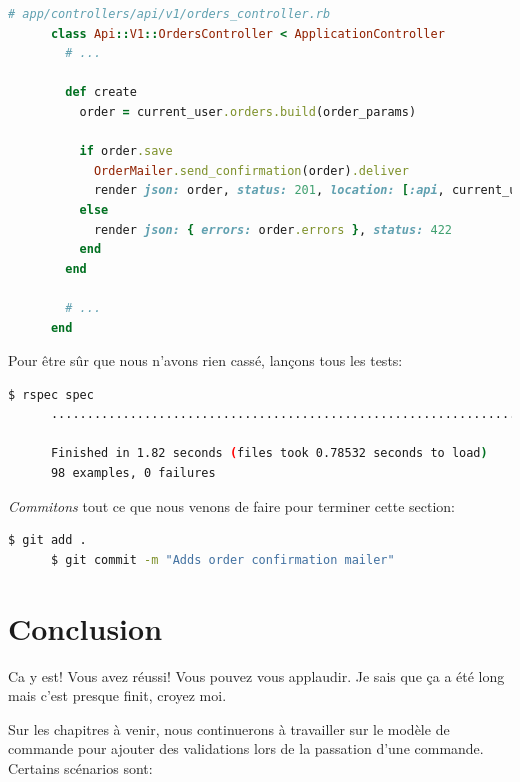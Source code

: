 \documentclass[]{report}
\begin{document}
    \begin{scriptsize}
      \begin{lstlisting}[language=ruby]
      # app/controllers/api/v1/orders_controller.rb
      class Api::V1::OrdersController < ApplicationController
        # ...

        def create
          order = current_user.orders.build(order_params)

          if order.save
            OrderMailer.send_confirmation(order).deliver
            render json: order, status: 201, location: [:api, current_user, order]
          else
            render json: { errors: order.errors }, status: 422
          end
        end

        # ...
      end
      \end{lstlisting}
    \end{scriptsize}

    Pour être sûr que nous n'avons rien cassé, lançons tous les tests:

    \begin{scriptsize}
      \begin{lstlisting}[language=bash]
      $ rspec spec
      ..................................................................................................

      Finished in 1.82 seconds (files took 0.78532 seconds to load)
      98 examples, 0 failures
      \end{lstlisting}
    \end{scriptsize}

    \textit{Commitons} tout ce que nous venons de faire pour terminer cette section:

    \begin{scriptsize}
      \begin{lstlisting}[language=bash]
      $ git add .
      $ git commit -m "Adds order confirmation mailer"
      \end{lstlisting}
    \end{scriptsize}

  \section{Conclusion}

   Ca y est! Vous avez réussi! Vous pouvez vous applaudir. Je sais que ça a été long mais c'est presque finit, croyez moi.

   Sur les chapitres à venir, nous continuerons à travailler sur le modèle de commande pour ajouter des validations lors de la passation d'une commande. Certains scénarios sont:
\end{document}
